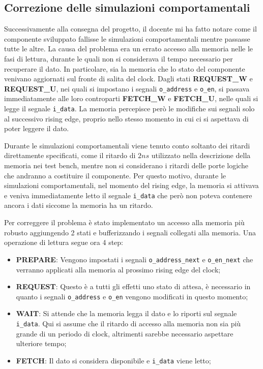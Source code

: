 \subsection{Correzione delle simulazioni comportamentali}

Successivamente alla consegna del progetto, il docente mi ha fatto notare come il componente sviluppato fallisse le simulazioni comportamentali mentre passasse tutte le altre. La causa del problema era un errato accesso alla memoria nelle le fasi di lettura, durante le quali non si considerava il tempo necessario per recuperare il dato. In particolare, sia la memoria che lo stato del componente venivano aggiornati sul fronte di salita del clock. Dagli stati \textbf{REQUEST\_W} e \textbf{REQUEST\_U}, nei quali si impostano i segnali \verb|o_address| e \verb|o_en|, si passava immediatamente alle loro controparti \textbf{FETCH\_W} e \textbf{FETCH\_U}, nelle quali si legge il segnale \verb|i_data|. La memoria percepisce però le modifiche sui segnali solo al successivo rising edge, proprio nello stesso momento in cui ci si aspettava di poter leggere il dato.

Durante le simulazioni comportamentali viene tenuto conto soltanto dei ritardi direttamente specificati, come il ritardo di $2ns$ utilizzato nella descrizione della memoria nei test bench, mentre non si considerano i ritardi delle porte logiche che andranno a costituire il componente. Per questo motivo, durante le simulazioni comportamentali, nel momento del rising edge, la memoria si attivava e veniva immediatamente letto il segnale \verb|i_data| che però non poteva contenere ancora i dati siccome la memoria ha un ritardo.

Per correggere il problema è stato implementato un accesso alla memoria più robusto aggiungendo 2 stati e bufferizzando i segnali collegati alla memoria. Una operazione di lettura segue ora 4 step:

\begin{itemize}
    \item \textbf{PREPARE}: Vengono impostati i segnali \verb|o_address_next| e \verb|o_en_next| che verranno applicati alla memoria al prossimo rising edge del clock;
    \item \textbf{REQUEST}: Questo è a tutti gli effetti uno stato di attesa, è necessario in quanto i segnali \verb|o_address| e \verb|o_en| vengono modificati in questo momento;
    \item \textbf{WAIT}: Si attende che la memoria legga il dato e lo riporti sul segnale \verb|i_data|. Qui si assume che il ritardo di accesso alla memoria non sia più grande di un periodo di clock, altrimenti sarebbe necessario aspettare ulteriore tempo;
    \item \textbf{FETCH}: Il dato si considera disponibile e \verb|i_data| viene letto;
\end{itemize}

